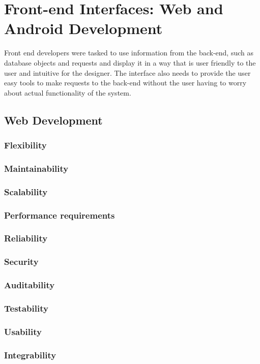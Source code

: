 \documentclass{article}
\begin{document}
\newpage
\section{Front-end Interfaces: Web and Android Development}
        Front end developers were tasked to use information from the back-end, such as database objects and requests and display it in a way that is user friendly to the user and intuitive for the designer. The interface also needs to provide the user easy tools to make requests to the back-end without the user having to worry about actual functionality of the system.
\subsection{Web Development}
        \subsubsection{Flexibility}
        \subsubsection{Maintainability}
        \subsubsection{Scalability}
        \subsubsection{Performance requirements}
        \subsubsection{Reliability}
        \subsubsection{Security}
        \subsubsection{Auditability}
        \subsubsection{Testability}
        \subsubsection{Usability}
        \subsubsection{Integrability}
\end{document}
